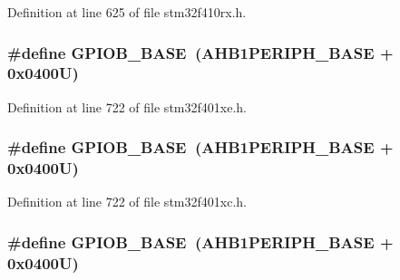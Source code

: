 Definition at line 625 of file stm32f410rx.\+h.

\subsubsection[{\texorpdfstring{G\+P\+I\+O\+B\+\_\+\+B\+A\+SE}{GPIOB_BASE}}]{\setlength{\rightskip}{0pt plus 5cm}\#define G\+P\+I\+O\+B\+\_\+\+B\+A\+SE~({\bf A\+H\+B1\+P\+E\+R\+I\+P\+H\+\_\+\+B\+A\+SE} + 0x0400\+U)}\hypertarget{group___peripheral__registers__structures_gac944a89eb789000ece920c0f89cb6a68}{}\label{group___peripheral__registers__structures_gac944a89eb789000ece920c0f89cb6a68}


Definition at line 722 of file stm32f401xe.\+h.

\subsubsection[{\texorpdfstring{G\+P\+I\+O\+B\+\_\+\+B\+A\+SE}{GPIOB_BASE}}]{\setlength{\rightskip}{0pt plus 5cm}\#define G\+P\+I\+O\+B\+\_\+\+B\+A\+SE~({\bf A\+H\+B1\+P\+E\+R\+I\+P\+H\+\_\+\+B\+A\+SE} + 0x0400\+U)}\hypertarget{group___peripheral__registers__structures_gac944a89eb789000ece920c0f89cb6a68}{}\label{group___peripheral__registers__structures_gac944a89eb789000ece920c0f89cb6a68}


Definition at line 722 of file stm32f401xc.\+h.

\subsubsection[{\texorpdfstring{G\+P\+I\+O\+B\+\_\+\+B\+A\+SE}{GPIOB_BASE}}]{\setlength{\rightskip}{0pt plus 5cm}\#define G\+P\+I\+O\+B\+\_\+\+B\+A\+SE~({\bf A\+H\+B1\+P\+E\+R\+I\+P\+H\+\_\+\+B\+A\+SE} + 0x0400\+U)}\hypertarget{group___peripheral__registers__structures_gac944a89eb789000ece920c0f89cb6a68}{}\label{group___peripheral__registers__structures_gac944a89eb789000ece920c0f89cb6a68}


